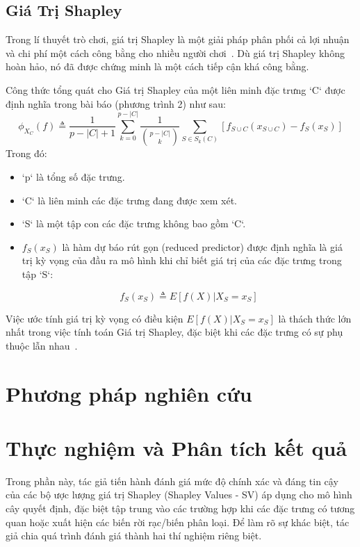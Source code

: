 \documentclass[12pt, a4paper]{article}
\begin{document}
\subsection{Giá Trị Shapley}
Trong lí thuyết trò chơi, giá trị Shapley là một giải pháp phân phối cả lợi nhuận và chi phí một cách công bằng cho nhiều người chơi~\citep{Shapley1953}. Dù giá trị Shapley không hoàn hảo, nó đã được chứng minh là một cách tiếp cận khá công bằng.

Công thức tổng quát cho Giá trị Shapley của một liên minh đặc trưng `C` được định nghĩa trong bài báo (phương trình 2) như sau:
$$
\phi_{X_C}(f) \triangleq \frac{1}{p - |C| + 1} \sum_{k=0}^{p-|C|} \frac{1}{\binom{p-|C|}{k}} \sum_{S \in S_k(C)} [f_{S \cup C}(x_{S \cup C}) - f_S(x_S)]
$$
Trong đó:
\begin{itemize}
    \item `p` là tổng số đặc trưng.
    \item `C` là liên minh các đặc trưng đang được xem xét.
    \item `S` là một tập con các đặc trưng không bao gồm `C`.

    \item $f_S(x_S)$ là hàm dự báo rút gọn (reduced predictor) được định nghĩa là giá trị kỳ vọng của đầu ra mô hình khi chỉ biết giá trị của các đặc trưng trong tập `S`:
    
    $$
    f_S(x_S) \triangleq E[f(X) | X_S = x_S]
    $$

\end{itemize}
Việc ước tính giá trị kỳ vọng có điều kiện $E[f(X) | X_S = x_S]$ là thách thức lớn nhất trong việc tính toán Giá trị Shapley, đặc biệt khi các đặc trưng có sự phụ thuộc lẫn nhau~\citep{Aas2020}.


\section{Phương pháp nghiên cứu}

\section{Thực nghiệm và Phân tích kết quả}

Trong phần này, tác giả tiến hành đánh giá mức độ chính xác và đáng tin cậy của các bộ ược lượng giá trị Shapley (Shapley Values - SV) áp dụng cho mô hình cây quyết định, đặc biệt tập trung vào các trường hợp khi các đặc trưng có tương quan hoặc xuất hiện các biến rời rạc/biến phân loại. Để làm rõ sự khác biệt, tác giả chia quá trình đánh giá thành hai thí nghiệm riêng biệt.
\end{document}
